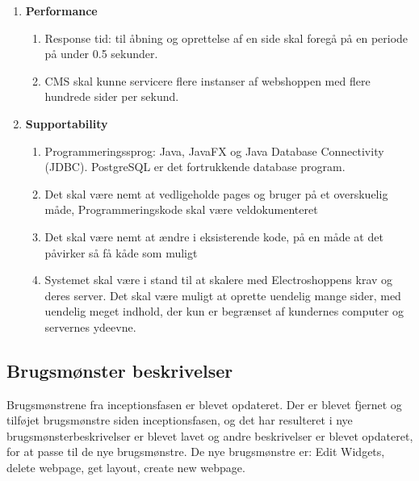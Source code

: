 \begin{enumerate}
\item\textbf{Performance}
	\begin{enumerate}
	\item Response tid: til åbning og oprettelse af en side skal foregå på en periode  på under 0.5 sekunder.
	\item CMS skal kunne servicere flere instanser af webshoppen med flere hundrede sider per sekund.
	\end{enumerate}

\item\textbf{Supportability}
	\begin{enumerate}
	\item Programmeringssprog: Java, JavaFX og Java Database Connectivity (JDBC).
	PostgreSQL er det fortrukkende database program.
	\item Det skal være nemt at vedligeholde pages og bruger på et overskuelig måde, Programmeringskode skal være veldokumenteret
	\item Det skal være nemt at ændre i eksisterende kode, på en måde at det påvirker så få kåde som muligt %
	\item Systemet skal være i stand til at skalere med Electroshoppens krav og deres server. Det skal være muligt at oprette uendelig mange sider, med uendelig meget indhold, der kun er begrænset af kundernes computer og servernes ydeevne.
	\end{enumerate}
\end{enumerate}


\subsection{Brugsmønster beskrivelser}

Brugsmønstrene fra inceptionsfasen er blevet opdateret. Der er blevet fjernet og tilføjet brugsmønstre siden inceptionsfasen,  og det har resulteret i nye brugsmønsterbeskrivelser er blevet lavet og andre beskrivelser er blevet opdateret, for at passe til de nye brugsmønstre. De nye brugsmønstre er: Edit Widgets, delete webpage, get layout, create new webpage.

